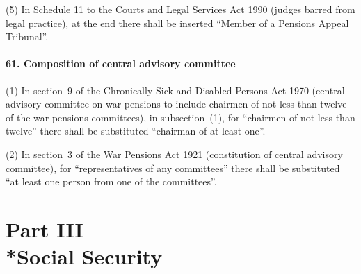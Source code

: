 \documentclass[12pt,a4paper]{article}
\begin{document}
(5) In Schedule 11 to the Courts and Legal Services Act 1990 (judges barred from legal practice), at the end there shall be inserted “Member of a Pensions Appeal Tribunal”.

\subsection{61. Composition of central advisory committee}

(1) In section~9 of the Chronically Sick and Disabled Persons Act 1970 (central advisory committee on war pensions to include chairmen of not less than twelve of the war pensions committees), in subsection~(1), for “chairmen of not less than twelve” there shall be substituted “chairman of at least one”.

(2) In section~3 of the War Pensions Act 1921 (constitution of central advisory committee), for “representatives of any committees” there shall be substituted “at least one person from one of the committees”.


\part[Part III --- Social Security]{Part III\\*Social Security}

\renewcommand\parthead{--- Part III}

\end{document}
